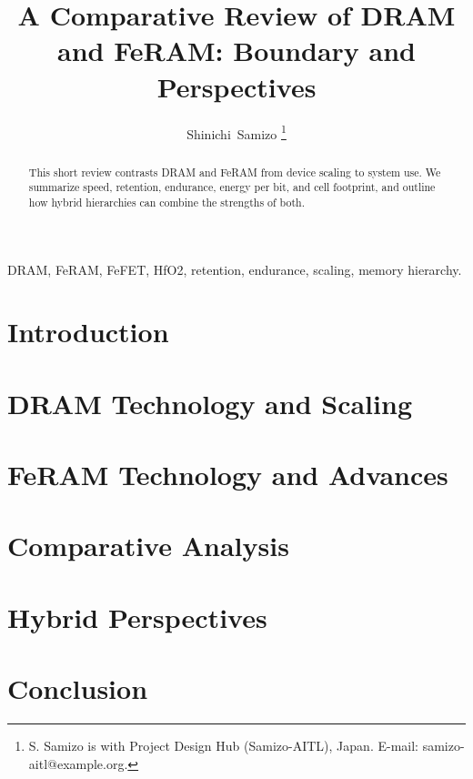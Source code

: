 \documentclass[journal]{IEEEtran}
\title{A Comparative Review of DRAM and FeRAM: Boundary and Perspectives}
\author{Shinichi~Samizo%
\thanks{S. Samizo is with Project Design Hub (Samizo-AITL), Japan. E-mail: samizo-aitl@example.org.}
}
\begin{document}
\maketitle

\begin{abstract}
This short review contrasts DRAM and FeRAM from device scaling to system use. We summarize speed, retention, endurance, energy per bit, and cell footprint, and outline how hybrid hierarchies can combine the strengths of both.
\end{abstract}

\begin{IEEEkeywords}
DRAM, FeRAM, FeFET, HfO2, retention, endurance, scaling, memory hierarchy.
\end{IEEEkeywords}

\section{Introduction}


\section{DRAM Technology and Scaling}


\section{FeRAM Technology and Advances}


\section{Comparative Analysis}
\label{sec:comparison}


\section{Hybrid Perspectives}


\section{Conclusion}




\end{document}
